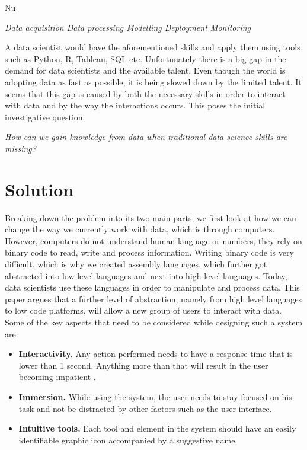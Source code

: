 Nu\documentclass[11pt,twoside, a4paper]{report}
\begin{document}
\begin{center}
    {\it Data acquisition \textrightarrow \hspace{} Data processing \textrightarrow \hspace{} Modelling \textrightarrow \hspace{} Deployment \textrightarrow \hspace{} Monitoring }
\end{center}

A data scientist would have the aforementioned skills and apply them using tools such as Python, R, Tableau, SQL etc. Unfortunately there is a big gap in the demand for data scientists and the available talent. Even though the world is adopting data as fast as possible, it is being slowed down by the limited talent. It seems that this gap is caused by both the necessary skills in order to interact with data and by the way the interactions occurs. This poses the initial investigative question: 
\begin{center}
    {\it How can we gain knowledge from data when traditional data science skills are missing?}
\end{center}


\section{Solution}

Breaking down the problem into its two main parts, we first look at how we can change the way we currently work with data, which is through computers. However, computers do not understand human language or numbers, they rely on binary code to read, write and process information. Writing binary code is very difficult, which is why we created assembly languages, which further got abstracted into low level languages and next into high level languages. Today, data scientists use these languages in order to manipulate and process data. This paper argues that a further level of abstraction, namely from high level languages to low code platforms, will allow a new group of users to interact with data. Some of the key aspects that need to be considered while designing such a system are:
\begin{itemize}
    \item \textbf{Interactivity.} Any action performed needs to have a response time that is lower than 1 second. Anything more than that will result in the user becoming impatient \parencite{nielseon}.
    \item \textbf{Immersion.} While using the system, the user needs to stay focused on his task and not be distracted by other factors such as the user interface.
    \item \textbf{Intuitive tools.} Each tool and element in the system should have an easily identifiable graphic icon accompanied by a suggestive name.
\end{itemize}
\end{document}
